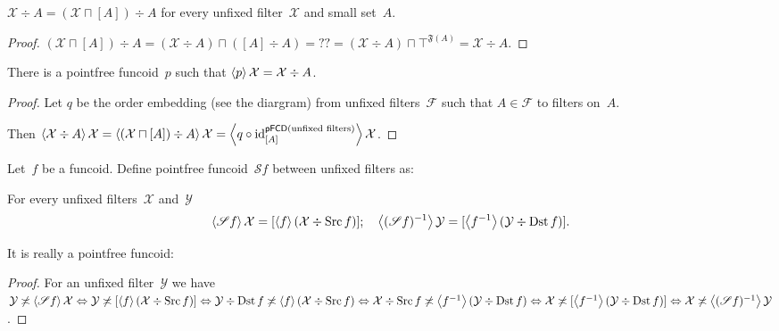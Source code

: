 \begin{lem}
$\mathcal{X}\div A=(\mathcal{X}\sqcap[A])\div A$
for every unfixed filter~$\mathcal{X}$ and small set~$A$.
\end{lem}

\begin{proof}
$(\mathcal{X}\sqcap[A])\div A=
(\mathcal{X}\div A)\sqcap([A]\div A)=
??=
(\mathcal{X}\div A)\sqcap\top^{\mathfrak{F}(A)}=
\mathcal{X}\div A$.
\end{proof}

\begin{cor}
There is a pointfree funcoid~$p$ such that
$\left\langle p\right\rangle\mathcal{X}=\mathcal{X}\div A$.
\end{cor}

\begin{proof}
Let $q$ be the order embedding (see the diargram) from
unfixed filters~$\mathcal{F}$ such that $A\in\mathcal{F}$
to filters on~$A$.

Then
$\left\langle \mathcal{X}\div A\right\rangle\mathcal{X}=
\left\langle (\mathcal{X}\sqcap[A])\div A\right\rangle\mathcal{X}=
\left\langle q\circ\operatorname{id}^{\mathsf{pFCD}(\text{unfixed filters})}_{[A]}\right\rangle\mathcal{X}$.
\end{proof}

Let~$f$ be a funcoid. Define pointfree
funcoid~$\mathscr{S}f$ between unfixed filters as:


\begin{defn}
For every unfixed filters~$\mathcal{X}$
and~$\mathcal{Y}$
\[
\left\langle \mathscr{S}f\right\rangle\mathcal{X}=
[\left\langle f\right\rangle(\mathcal{X}\div\operatorname{Src} f)];\quad
\left\langle (\mathscr{S}f)^{-1}\right\rangle\mathcal{Y}=
[\left\langle f^{-1}\right\rangle(\mathcal{Y}\div\operatorname{Dst} f)].
\]
\end{defn}

It is really a pointfree funcoid:

\begin{proof}
For an unfixed filter~$\mathcal{Y}$ we have
$\mathcal{Y}\not\asymp\left\langle \mathscr{S}f\right\rangle\mathcal{X}
\Leftrightarrow
\mathcal{Y}\not\asymp[\left\langle f\right\rangle(\mathcal{X}\div\operatorname{Src} f)]
\Leftrightarrow
\mathcal{Y}\div\operatorname{Dst} f\not\asymp\left\langle f\right\rangle(\mathcal{X}\div\operatorname{Src} f)
\Leftrightarrow
\mathcal{X}\div\operatorname{Src} f\not\asymp\left\langle f^{-1}\right\rangle(\mathcal{Y}\div\operatorname{Dst} f)
\Leftrightarrow
\mathcal{X}\not\asymp[\left\langle f^{-1}\right\rangle(\mathcal{Y}\div\operatorname{Dst} f)]
\Leftrightarrow
\mathcal{X}\not\asymp\left\langle (\mathscr{S}f)^{-1}\right\rangle\mathcal{Y}$.
\end{proof}

